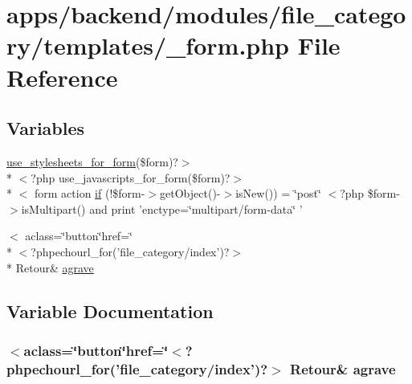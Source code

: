 \hypertarget{backend_2modules_2file__category_2templates_2__form_8php}{\section{apps/backend/modules/file\-\_\-category/templates/\-\_\-form.php File Reference}
\label{backend_2modules_2file__category_2templates_2__form_8php}
}
\subsection*{Variables}
\begin{DoxyCompactItemize}
\item 
\hyperlink{live_2modules_2user_2templates_2__form_8php_a86bc4522fdbe625b07bc4a4d6eec3df7}{use\-\_\-stylesheets\-\_\-for\-\_\-form}(\$form)?$>$\\*
$<$?php use\-\_\-javascripts\-\_\-for\-\_\-form(\$form)?$>$\\*
$<$ form action \hyperlink{backend_2modules_2file__category_2templates_2__form_8php_abd1acf0179bbb4a56e04d4fccdbc121f}{if} (!\$form-\/$>$get\-Object()-\/$>$is\-New()) = \char`\"{}post\char`\"{} $<$?php \$form-\/$>$is\-Multipart() and print 'enctype=\char`\"{}multipart/form-\/data\char`\"{} '
\item 
$<$ aclass=\char`\"{}button\char`\"{}href=\char`\"{}\\*
$<$?phpechourl\-\_\-for('file\-\_\-category/index')?$>$\\*
 Retour\& \hyperlink{backend_2modules_2file__category_2templates_2__form_8php_ac27e036b111e33d03f48d443f03f65bf}{agrave}
\end{DoxyCompactItemize}


\subsection{Variable Documentation}
\hypertarget{backend_2modules_2file__category_2templates_2__form_8php_ac27e036b111e33d03f48d443f03f65bf}{
\subsubsection[{agrave}]{\setlength{\rightskip}{0pt plus 5cm}$<$aclass=\char`\"{}button\char`\"{}href=\char`\"{}$<$?phpechourl\-\_\-for('file\-\_\-category/index')?$>$ Retour\& agrave}}\label{backend_2modules_2file__category_2templates_2__form_8php_ac27e036b111e33d03f48d443f03f65bf}


